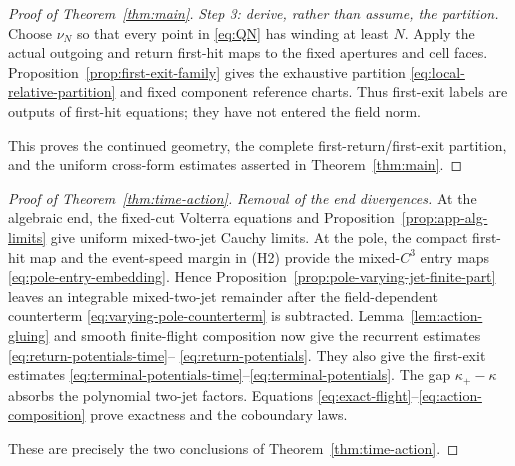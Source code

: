 \documentclass[11pt]{amsart}
\numberwithin{equation}{section}
\theoremstyle{definition}
\theoremstyle{remark}
\begin{document}
\begin{proof}[Proof of Theorem~\ref{thm:main}]
\emph{Step 3: derive, rather than assume, the partition.}
Choose $\nu_N$ so that every point in \eqref{eq:QN} has winding at least
$N$.  Apply the actual outgoing and return first-hit maps to the fixed
apertures and cell faces.  Proposition~\ref{prop:first-exit-family} gives
the exhaustive partition \eqref{eq:local-relative-partition} and fixed
component reference charts.  Thus first-exit
labels are outputs of first-hit equations; they have not entered the field
norm.

This proves the continued geometry, the complete first-return/first-exit partition,
and the uniform cross-form estimates asserted in
Theorem~\ref{thm:main}.
\end{proof}

\begin{proof}[Proof of Theorem~\ref{thm:time-action}]
\emph{Removal of the end divergences.}
At the algebraic end, the fixed-cut Volterra equations and
Proposition~\ref{prop:app-alg-limits} give uniform mixed-two-jet Cauchy
limits.  At the pole,
the compact first-hit map and the event-speed margin in \textup{(H2)}
provide the mixed-$C^3$ entry maps
\eqref{eq:pole-entry-embedding}.  Hence
Proposition~\ref{prop:pole-varying-jet-finite-part} leaves an integrable
mixed-two-jet remainder after the field-dependent counterterm
\eqref{eq:varying-pole-counterterm} is subtracted.
Lemma~\ref{lem:action-gluing} and smooth finite-flight composition now give
the recurrent estimates \eqref{eq:return-potentials-time}--
\eqref{eq:return-potentials}.  They also give the first-exit estimates
\eqref{eq:terminal-potentials-time}--\eqref{eq:terminal-potentials}.  The gap
$\kappa_+-\kappa$ absorbs the polynomial two-jet factors.  Equations
\eqref{eq:exact-flight}--\eqref{eq:action-composition} prove exactness and
the coboundary laws.

These are precisely the two conclusions of
Theorem~\ref{thm:time-action}.
\end{proof}
\end{document}
